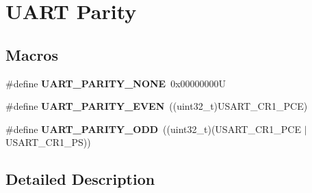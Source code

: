 \hypertarget{group___u_a_r_t___parity}{}\section{U\+A\+RT Parity}
\label{group___u_a_r_t___parity}
\subsection*{Macros}
\begin{DoxyCompactItemize}
\item 
\mbox{\label{group___u_a_r_t___parity_ga270dea6e1a92dd83fe58802450bdd60c}} 
\#define {\bfseries U\+A\+R\+T\+\_\+\+P\+A\+R\+I\+T\+Y\+\_\+\+N\+O\+NE}~0x00000000U
\item 
\mbox{\label{group___u_a_r_t___parity_ga063b14ac42ef9e8f4246c17a586b14eb}} 
\#define {\bfseries U\+A\+R\+T\+\_\+\+P\+A\+R\+I\+T\+Y\+\_\+\+E\+V\+EN}~((uint32\+\_\+t)U\+S\+A\+R\+T\+\_\+\+C\+R1\+\_\+\+P\+CE)
\item 
\mbox{\label{group___u_a_r_t___parity_ga229615e64964f68f7a856ea6ffea359e}} 
\#define {\bfseries U\+A\+R\+T\+\_\+\+P\+A\+R\+I\+T\+Y\+\_\+\+O\+DD}~((uint32\+\_\+t)(U\+S\+A\+R\+T\+\_\+\+C\+R1\+\_\+\+P\+CE $\vert$ U\+S\+A\+R\+T\+\_\+\+C\+R1\+\_\+\+PS))
\end{DoxyCompactItemize}


\subsection{Detailed Description}
